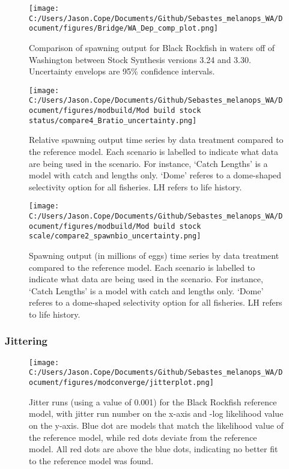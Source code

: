 \documentclass[11pt,
  english,
  letterpaper,
]{article}
\begin{document}
\pagebreak

\begin{figure}
\centering
\texttt{[image: C:/Users/Jason.Cope/Documents/Github/Sebastes\_melanops\_WA/Document/figures/Bridge/WA\_Dep\_comp\_plot.png]}
\caption{Comparison of spawning output for Black Rockfish in waters off of Washington between Stock Synthesis versions 3.24 and 3.30. Uncertainty envelops are 95\% confidence intervals.\label{fig:deps_bridge_comps}}
\end{figure}

\pagebreak

\begin{figure}
\centering
\texttt{[image: C:/Users/Jason.Cope/Documents/Github/Sebastes\_melanops\_WA/Document/figures/modbuild/Mod build stock status/compare4\_Bratio\_uncertainty.png]}
\caption{Relative spawning output time series by data treatment compared to the reference model. Each scenario is labelled to indicate what data are being used in the scenario. For instance, `Catch Lengths' is a model with catch and lengths only. `Dome' referes to a dome-shaped selectivity option for all fisheries. LH refers to life history.\label{fig:modbuild-data-depl}}
\end{figure}

\begin{figure}
\centering
\texttt{[image: C:/Users/Jason.Cope/Documents/Github/Sebastes\_melanops\_WA/Document/figures/modbuild/Mod build stock scale/compare2\_spawnbio\_uncertainty.png]}
\caption{Spawning output (in millions of eggs) time series by data treatment compared to the reference model. Each scenario is labelled to indicate what data are being used in the scenario. For instance, `Catch Lengths' is a model with catch and lengths only. `Dome' referes to a dome-shaped selectivity option for all fisheries. LH refers to life history.\label{fig:modbuild-data-ssb}}
\end{figure}

\hypertarget{jittering}{%
\subsubsection{Jittering}\label{jittering}}

\begin{figure}
\centering
\texttt{[image: C:/Users/Jason.Cope/Documents/Github/Sebastes\_melanops\_WA/Document/figures/modconverge/jitterplot.png]}
\caption{Jitter runs (using a value of 0.001) for the Black Rockfish reference model, with jitter run number on the x-axis and -log likelihood value on the y-axis. Blue dot are models that match the likelihood value of the reference model, while red dots deviate from the reference model. All red dots are above the blue dots, indicating no better fit to the reference model was found.\label{fig:jitter}}
\end{figure}
\end{document}
